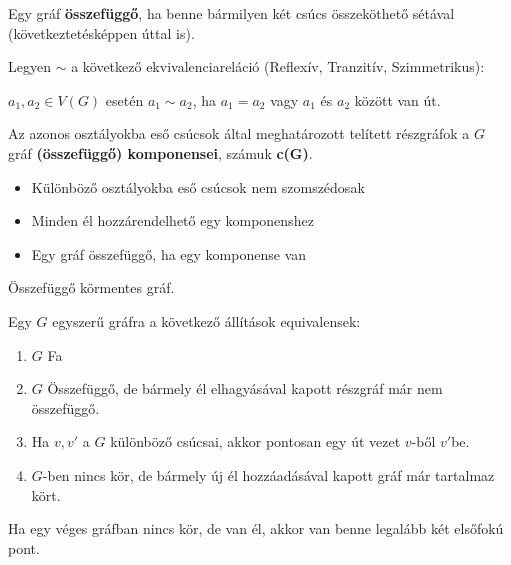 \documentclass[10pt]{article}
\renewcommand{\\}{\par\noindent}
\begin{document}
\begin{frame}
\begin{tcolorbox}[title={Def.: Összeföggőség}]
Egy gráf \textbf{összefüggő}, ha benne bármilyen két csúcs összeköthető sétával (következtetésképpen úttal is).
\end{tcolorbox}
\begin{tcolorbox}[title={Def.: Komponensek}]
Legyen $\sim$ a következő ekvivalenciareláció (Reflexív, Tranzitív, Szimmetrikus):\\
\bigskip
$a_1, a_2 \in V(G)$ esetén $a_1 \sim a_2$, ha $a_1 = a_2$ vagy $a_1$ és $a_2$ között van út.\\
\bigskip
Az azonos osztályokba eső csúcsok által meghatározott telített részgráfok a $G$ gráf \textbf{(összefüggő) komponensei}, számuk \textbf{c(G)}.
\end{tcolorbox}
\begin{tcolorbox}[title={Ész}]
\begin{itemize}
\item Különböző osztályokba eső csúcsok nem szomszédosak
\item Minden él hozzárendelhető egy komponenshez
\item Egy gráf összefüggő, ha egy komponense van
\end{itemize}
\end{tcolorbox}
\end{frame}

\begin{frame}
\begin{tcolorbox}[title={Def.: Fa}]
Összefüggő körmentes gráf.
\end{tcolorbox}
\end{frame}

\begin{frame}
\begin{tcolorbox}[title={Tétel: Equivalens állítások fákra}]
Egy $G$ egyszerű gráfra a következő állítások equivalensek:
\begin{enumerate}
\item $G$ Fa
\item $G$ Összefüggő, de bármely él elhagyásával kapott részgráf már nem összefüggő.
\item Ha $v, v'$ a $G$ különböző csúcsai, akkor pontosan egy út vezet $v$-ből $v'$be.
\item $G$-ben nincs kör, de bármely új él hozzáadásával kapott gráf már tartalmaz kört.
\end{enumerate}
\end{tcolorbox}

\begin{tcolorbox}[title={Tétel: Elsőfokú pontok}]
Ha egy véges gráfban nincs kör, de van él, akkor van benne legalább két elsőfokú pont.
\end{tcolorbox}
\end{frame}
\end{document}
